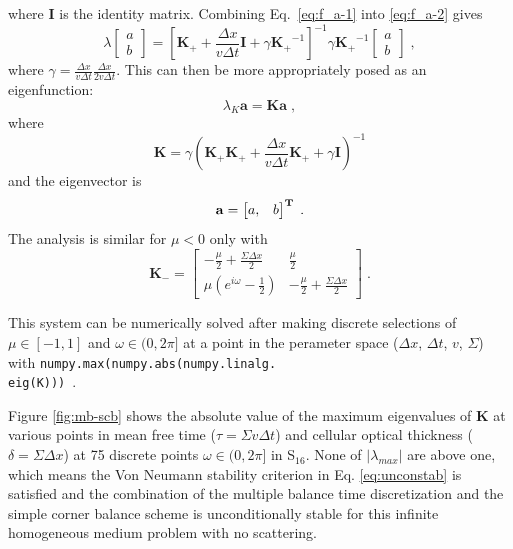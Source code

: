 where $\bm{I}$ is the identity matrix. Combining Eq.~\eqref{eq:f_a-1} into \eqref{eq:f_a-2} gives
\begin{equation}
    \lambda
    \begin{bmatrix}
        a \\b
    \end{bmatrix}
    = \left[ \bm{K_{+}} + \frac{\Delta x}{v\Delta t} \bm{I} + \gamma\bm{K_{+}}^{-1} \right]^{-1} \gamma \bm{K_{+}}^{-1}
    \begin{bmatrix}
        a \\ b
    \end{bmatrix} \; ,
\end{equation}
where $\gamma = \frac{\Delta x}{v\Delta t}  \frac{\Delta x}{2v\Delta t}$.
This can then be more appropriately posed as an eigenfunction:
\begin{equation}
    \lambda_K
    \bm{a}
    = \bm{K} \bm{a}\;,
\end{equation}
where
\begin{equation}
    \bm{K} = \gamma \left( \bm{K_{+}}\bm{K_{+}} + \frac{\Delta x}{v \Delta t}\bm{K_{+}} + \gamma \bm{I}\right)^{-1}
\end{equation}
and the eigenvector is
\begin{equation}
    \bf{a} = \begin{bmatrix}
        a, & b
    \end{bmatrix} ^T \;.
\end{equation}
The analysis is similar for $\mu<0$ only with
\begin{equation}
    \bm{K_{-}} = \begin{bmatrix}
        -\frac{\mu}{2} + \frac{\Sigma\Delta x}{2} & \frac{\mu}{2} \\
        \mu \left ( e^{i\omega} - \frac{1}{2} \right) & -\frac{\mu}{2} + \frac{\Sigma\Delta x}{2} 
    \end{bmatrix} \;.
\end{equation}

This system can be numerically solved after making discrete selections of $\mu \in [-1, 1]$ and $\omega \in (0,2\pi]$ at a point in the perameter space ($\Delta x$, $\Delta t$, $v$, $\Sigma$) with \texttt{numpy.max(numpy.abs(numpy.linalg.\\eig(K)))}~\cite{harris2020array}.

Figure \ref{fig:mb-scb} shows the absolute value of the maximum eigenvalues of $\bm{K}$ at various points in mean free time ($\tau=\Sigma v\Delta t$) and cellular optical thickness ($\delta=\Sigma\Delta x$) at 75 discrete points $\omega \in (0,2\pi]$ in S$_{16}$.
None of $|\lambda_{max}|$ are above one, which means the Von Neumann stability criterion in Eq. \eqref{eq:unconstab} is satisfied and the combination of the multiple balance time discretization and the simple corner balance scheme is unconditionally stable for this infinite homogeneous medium problem with no scattering.

